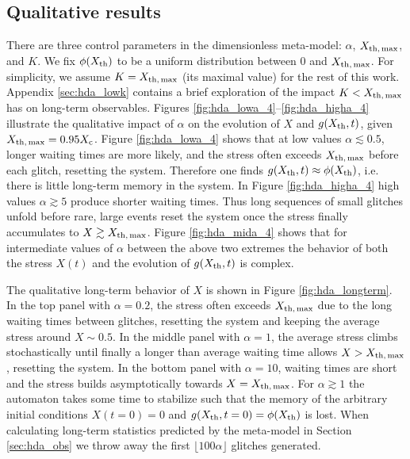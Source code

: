 \subsection{Qualitative results} \label{sec:hda_qual}

There are three control parameters in the dimensionless meta-model: $\alpha$, $X_{\rm th,\,max}$, and $K$. We fix $\phi(X_{\rm th})$ to be a uniform distribution between $0$ and $X_{\rm th,\,max}$. For simplicity, we assume $K=X_{\rm th,\,max}$ (its maximal value) for the rest of this work. Appendix \ref{sec:hda_lowk} contains a brief exploration of the impact $K < X_{\rm th,\,max}$ has on long-term observables. Figures \ref{fig:hda_lowa_4}--\ref{fig:hda_higha_4} illustrate the qualitative impact of $\alpha$ on the evolution of $X$ and $g(X_{\rm th}, t)$, given $X_{\rm th,\,max} = 0.95X_\textrm{c}$. Figure \ref{fig:hda_lowa_4} shows that at low values $\alpha \lesssim 0.5$, longer waiting times are more likely, and the stress often exceeds $X_{\rm th,\,max}$ before each glitch, resetting the system. Therefore one finds $g(X_{\rm th}, t) \approx \phi(X_{\rm th})$, i.e. there is little long-term memory in the system. In Figure \ref{fig:hda_higha_4} high values $\alpha \gtrsim 5$ produce shorter waiting times. Thus long sequences of small glitches unfold before rare, large events reset the system once the stress finally accumulates to $X \gtrsim X_{\rm th,\,max}$. Figure \ref{fig:hda_mida_4} shows that for intermediate values of $\alpha$ between the above two extremes the behavior of both the stress $X(t)$ and the evolution of $g(X_{\rm th}, t)$ is complex. 

The qualitative long-term behavior of $X$ is shown in Figure \ref{fig:hda_longterm}. In the top panel with $\alpha=0.2$, the stress often exceeds $X_{\rm th,\,max}$ due to the long waiting times between glitches, resetting the system and keeping the average stress around $X \sim 0.5$. In the middle panel with $\alpha=1$, the average stress climbs stochastically until finally a longer than average waiting time allows $X > X_{\rm th,\,max}$, resetting the system. In the bottom panel with $\alpha=10$, waiting times are short and the stress builds asymptotically towards $X = X_{\rm th,\,max}$. For $\alpha \gtrsim 1$ the automaton takes some time to stabilize such that the memory of the arbitrary initial conditions $X(t=0) = 0$ and $g(X_{\rm th}, t=0) = \phi(X_{\rm th})$ is lost. When calculating long-term statistics predicted by the meta-model in Section \ref{sec:hda_obs} we throw away the first $\lfloor100 \alpha\rfloor$ glitches generated.

